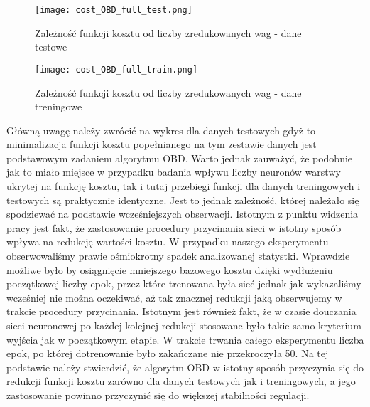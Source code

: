 \begin{figure}[!htb]
  \label{fig:Koszt-OBD-full-test}
  \centering \texttt{[image: cost\_OBD\_full\_test.png]}
  \caption{Zależność funkcji kosztu od liczby zredukowanych wag - dane testowe}

  \vspace*{\floatsep}%

 \label{fig:Koszt-OBD-full-train}
  \centering \texttt{[image: cost\_OBD\_full\_train.png]}
  \caption{Zależność funkcji kosztu od liczby zredukowanych wag - dane treningowe}
\end{figure}

\par Główną uwagę należy zwrócić na wykres dla danych testowych gdyż to minimalizacja funkcji kosztu popełnianego na tym zestawie danych jest podstawowym zadaniem algorytmu OBD. Warto jednak zauważyć, że podobnie jak to miało miejsce w przypadku badania wpływu liczby neuronów warstwy ukrytej na funkcję kosztu, tak i tutaj przebiegi funkcji dla danych treningowych i testowych są praktycznie identyczne. Jest to jednak zależność, której należało się spodziewać na podstawie wcześniejszych obserwacji. Istotnym z punktu widzenia pracy jest fakt, że zastosowanie procedury przycinania sieci w istotny sposób wpływa na redukcję wartości kosztu. W przypadku naszego eksperymentu obserwowaliśmy prawie ośmiokrotny spadek analizowanej statystki. Wprawdzie możliwe było by osiągnięcie mniejszego bazowego kosztu dzięki wydłużeniu początkowej liczby epok, przez które trenowana była sieć jednak jak wykazaliśmy wcześniej nie można oczekiwać, aż tak znacznej redukcji jaką obserwujemy w trakcie procedury przycinania. Istotnym jest również fakt, że w czasie douczania sieci neuronowej po każdej kolejnej redukcji stosowane było takie samo kryterium wyjścia jak w początkowym etapie. W trakcie trwania całego eksperymentu liczba epok, po której dotrenowanie było zakańczane nie przekroczyła 50. Na tej podstawie należy stwierdzić, że algorytm OBD w istotny sposób przyczynia się do redukcji funkcji kosztu zarówno dla danych testowych jak i treningowych, a jego zastosowanie powinno przyczynić się do większej stabilności regulacji. 
